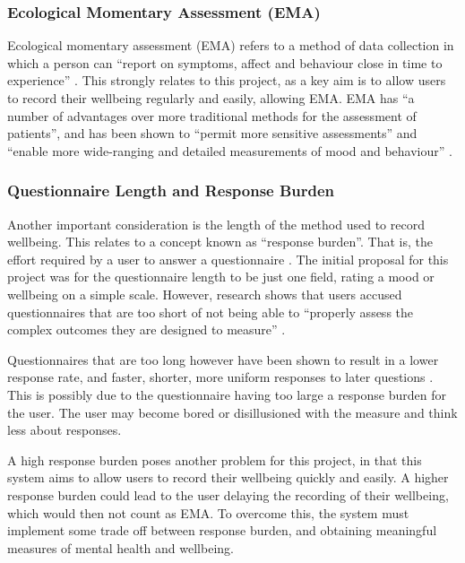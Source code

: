 \documentclass[11pt,openright,a4paper]{report}
\begin{document}
\subsubsection{Ecological Momentary Assessment (EMA)} \label{sec:ema}
Ecological momentary assessment (EMA) refers to a method of data collection in which a person can \enquote{report on symptoms, affect and behaviour close in time to experience} \parencite{moskowitz2006ecological}. This strongly relates to this project, as a key aim is to allow users to record their wellbeing regularly and easily, allowing EMA. EMA has \enquote{a number of advantages over more traditional methods for the assessment of patients}, and has been shown to \enquote{permit more sensitive assessments} and \enquote{enable more wide-ranging and detailed measurements of mood and behaviour} \parencite{moskowitz2006ecological}.

\subsubsection{Questionnaire Length and Response Burden} \label{questionnairelength}
Another important consideration is the length of the method used to record wellbeing. This relates to a concept known as \enquote{response burden}. That is, the effort required by a user to answer a questionnaire \parencite{rolstad2011response}. The initial proposal for this project was for the questionnaire length to be just one field, rating a mood or wellbeing on a simple scale. However, research shows that users accused questionnaires that are too short of not being able to \enquote{properly assess the complex
outcomes they are designed to measure} \parencite{crawford2011selecting}.

Questionnaires that are too long however have been shown to result in a lower response rate, and faster, shorter, more uniform responses to later questions \parencite{galesic2009effects}. This is possibly due to the questionnaire having too large a response burden for the user. The user may become bored or disillusioned with the measure and think less about responses.

A high response burden poses another problem for this project, in that this system aims to allow users to record their wellbeing quickly and easily. A higher response burden could lead to the user delaying the recording of their wellbeing, which would then not count as EMA. To overcome this, the system must implement some trade off between response burden, and obtaining meaningful measures of mental health and wellbeing.
\end{document}
